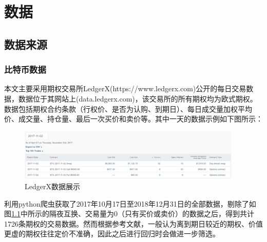 \chapter{数据}
\section{数据来源}
\subsection{比特币数据}
\par{
    
    本文主要采用期权交易所LedgerX(https://www.ledgerx.com)公开的每日交易数据，数据位于其网站上(data.ledgerx.com)，该交易所的所有期权均为欧式期权。数据包括期权合约条款（行权价、是否为认购、到期日）、每日成交量加权平均价、成交量、持仓量、最后一次买价和卖价等。其中一天的数据示例如下图所示：
    \begin{figure}[H]
        \begin{small}
            \begin{center}
                \includegraphics[width=0.95\textwidth]{figures/data_example.png}
            \end{center}
            \caption{LedgerX数据展示}
            \label{data_example}
        \end{small}
    \end{figure}
    利用python爬虫获取了2017年10月17日至2018年12月31日的全部数据，剔除了如图\ref{data_example}中所示的隔夜互换、交易量为0（只有买价或卖价）的数据之后，得到共计1726条期权的交易数据。然而根据参考文献\cite{J-1972}\cite{Jame-1979}，一般认为离到期日较近的期权、价值更虚的期权往往定价不准确，因此之后进行回归时会做进一步筛选。
}
